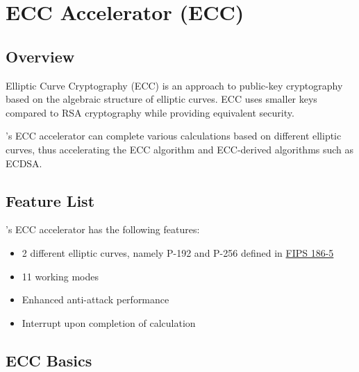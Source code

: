 \documentclass[main\_\_EN.tex]{subfiles}
\begin{document}

\ifglobal
\else
    \listoftodos
    {\let\clearpage\relax \listofdonetodos}
    \tableofcontents
\fi



\hypertarget{ecc}{}
\chapter{ECC Accelerator (ECC)}
\label{mod:ecc}

\section{Overview}

Elliptic Curve Cryptography (ECC) is an approach to public-key cryptography based on the algebraic structure of elliptic curves. ECC uses smaller keys compared to RSA cryptography while providing equivalent security.

\chipname{}'s ECC accelerator can complete various calculations based on different elliptic curves, thus accelerating the ECC algorithm and ECC-derived algorithms such as ECDSA.

\section{Feature List}

\chipname{}'s ECC accelerator has the following features:

\begin{itemize}
    \item 2 different elliptic curves, namely P-192 and P-256 defined in \href{https://nvlpubs.nist.gov/nistpubs/FIPS/NIST.FIPS.186-5.pdf}{FIPS 186-5}
    \item 11 working modes
    \item Enhanced anti-attack performance
    \item Interrupt upon completion of calculation
\end{itemize}

\section{ECC Basics}
\end{document}

